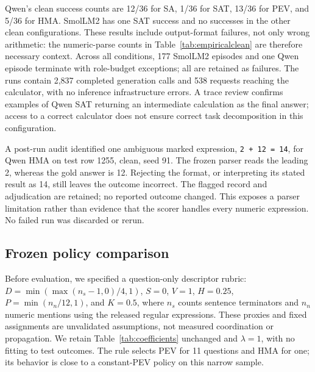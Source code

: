 \documentclass[11pt]{article}
\begin{document}
\begin{table}[htbp]\centering\small
\caption{Observed clean-condition results, 36 attempts per row. Parsed counts nonmissing numeric parses under the frozen parser. Intervals concern accuracy; tokens and seconds are episode medians.}\label{tab:empiricalclean}

\end{table}

Qwen's clean success counts are 12/36 for SA, 1/36 for SAT, 13/36 for PEV, and 5/36 for HMA. SmolLM2 has one SAT success and no successes in the other clean configurations. These results include output-format failures, not only wrong arithmetic: the numeric-parse counts in Table~\ref{tab:empiricalclean} are therefore necessary context. Across all conditions, 177 SmolLM2 episodes and one Qwen episode terminate with role-budget exceptions; all are retained as failures. The runs contain 2,837 completed generation calls and 538 requests reaching the calculator, with no inference infrastructure errors. A trace review confirms examples of Qwen SAT returning an intermediate calculation as the final answer; access to a correct calculator does not ensure correct task decomposition in this configuration.

A post-run audit identified one ambiguous marked expression, \texttt{2 + 12 = 14}, for Qwen HMA on test row 1255, clean, seed 91. The frozen parser reads the leading 2, whereas the gold answer is 12. Rejecting the format, or interpreting its stated result as 14, still leaves the outcome incorrect. The flagged record and adjudication are retained; no reported outcome changed. This exposes a parser limitation rather than evidence that the scorer handles every numeric expression. No failed run was discarded or rerun.

\subsection{Frozen policy comparison}
Before evaluation, we specified a question-only descriptor rubric: $D=\min(\max(n_s-1,0)/4,1)$, $S=0$, $V=1$, $H=0.25$, $P=\min(n_n/12,1)$, and $K=0.5$, where $n_s$ counts sentence terminators and $n_n$ numeric mentions using the released regular expressions. These proxies and fixed assignments are unvalidated assumptions, not measured coordination or propagation. We retain Table~\ref{tab:coefficients} unchanged and $\lambda=1$, with no fitting to test outcomes. The rule selects PEV for 11 questions and HMA for one; its behavior is close to a constant-PEV policy on this narrow sample.
\end{document}

